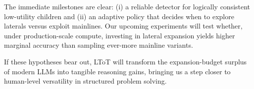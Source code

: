 \documentclass{IEEEtran}
\begin{document}
The immediate milestones are clear: (i) a reliable detector for logically consistent low-utility children and (ii) an adaptive policy that decides when to explore laterals versus exploit mainlines.
Our upcoming experiments will test whether, under production-scale compute, investing in lateral expansion yields higher marginal accuracy than sampling ever-more mainline variants.

If these hypotheses bear out, LToT will transform the expansion-budget surplus of modern LLMs into tangible reasoning gains, bringing us a step closer to human-level versatility in structured problem solving.
\end{document}
